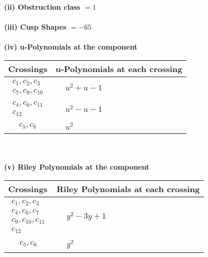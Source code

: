\documentclass[1p]{elsarticle_modified}
\theoremstyle{definition}
\begin{document}
\flushleft \textbf{(ii) Obstruction class $= 1$}\\~\\
\flushleft \textbf{(iii) Cusp Shapes $= -65$}\\~\\
\newpage\renewcommand{\arraystretch}{1}
\flushleft \textbf{(iv) u-Polynomials at the component}\newline \\
\begin{tabular}{m{50pt}|m{274pt}}
Crossings & \hspace{64pt}u-Polynomials at each crossing \\
\hline $$\begin{aligned}c_{1},c_{2},c_{3}\\c_{7},c_{9},c_{10}\end{aligned}$$&$\begin{aligned}
&u^2+u-1
\end{aligned}$\\
\hline $$\begin{aligned}c_{4},c_{6},c_{11}\\c_{12}\end{aligned}$$&$\begin{aligned}
&u^2- u-1
\end{aligned}$\\
\hline $$\begin{aligned}c_{5},c_{8}\end{aligned}$$&$\begin{aligned}
&u^2
\end{aligned}$\\
\hline
\end{tabular}\\~\\
\newpage\renewcommand{\arraystretch}{1}
\flushleft \textbf{(v) Riley Polynomials at the component}\newline \\
\begin{tabular}{m{50pt}|m{274pt}}
Crossings & \hspace{64pt}Riley Polynomials at each crossing \\
\hline $$\begin{aligned}c_{1},c_{2},c_{3}\\c_{4},c_{6},c_{7}\\c_{9},c_{10},c_{11}\\c_{12}\end{aligned}$$&$\begin{aligned}
&y^2-3 y+1
\end{aligned}$\\
\hline $$\begin{aligned}c_{5},c_{8}\end{aligned}$$&$\begin{aligned}
&y^2
\end{aligned}$\\
\hline
\end{tabular}\\~\\
\end{document}
